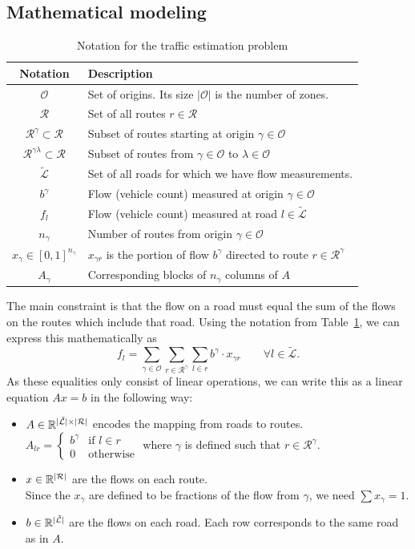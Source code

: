 \documentclass{article} %
\newcommand{\OO}{\mathcal{O}}
\newcommand{\RR}{\mathcal{R}}
\begin{document}
\subsection{Mathematical modeling}
\begin{table}[htbp]
\caption{Notation for the traffic estimation problem}
\label{tab-notation}
\centering
\begin{tabular}{cl}
\toprule
Notation & Description \\
\midrule
$\OO$ & Set of origins. Its size $|\OO|$ is the number of zones. \\
$\RR$ & Set of all routes $r\in \RR$\\
$\RR^\gamma \subset\RR$ & Subset of routes starting at origin $\gamma\in\OO$ \\
$\RR^{\gamma \lambda} \subset\RR$ & Subset of routes from $\gamma\in\OO$ to $\lambda\in \OO$ \\
$\tilde{\mathcal{L}}$ & Set of all roads for which we have flow measurements. \\
$b^\gamma$ & Flow (vehicle count) measured at origin $\gamma\in\OO$ \\
$f_l$ & Flow (vehicle count) measured at road $l \in \tilde{\mathcal{L}}$ \\
$n_\gamma$ & Number of routes from origin $\gamma\in \OO$\\
$x_\gamma \in[0, 1]^{n_\gamma}$ & $x_{\gamma r}$ is the portion of flow $b^\gamma$ directed to route $r \in \RR^\gamma$ \\
$A_{\gamma}$ & Corresponding blocks of $n_{\gamma}$ columns of $A$\\
\bottomrule
\end{tabular}
\end{table}
The main constraint is that the flow on a road must equal the sum of the flows on the routes which include that road.
Using the notation from Table~\ref{tab-notation}, we can express this mathematically as \[
  f_l = \sum_{\gamma \in \OO}\sum_{r \in \RR^\gamma}\sum_{l \in r} b^\gamma \cdot x_{\gamma r} \qquad \forall l \in \tilde{\mathcal{L}}.
\]
As these equalities only consist of linear operations, we can write this as a linear equation $Ax = b$ in the following way:
\begin{itemize}
  \item $A \in \R^{|\tilde{\mathcal{L}}| \times |\RR|}$ encodes the mapping from roads to routes. \\
    $A_{lr} = \begin{cases} b^\gamma & \text{if }l \in r \\ 0 & \text{otherwise} \end{cases}$
    where $\gamma$ is defined such that $r \in \RR^\gamma$.
  \item $x \in \R^{|\RR|}$ are the flows on each route. \\
    Since the $x_\gamma$ are defined to be fractions of the flow from $\gamma$, we need $\sum x_\gamma = 1$.
  \item $b \in \mathbb{R}^{|\tilde{\mathcal{L}}|}$ are the flows on each road.
    Each row corresponds to the same road as in $A$.
\end{itemize}
\end{document}
